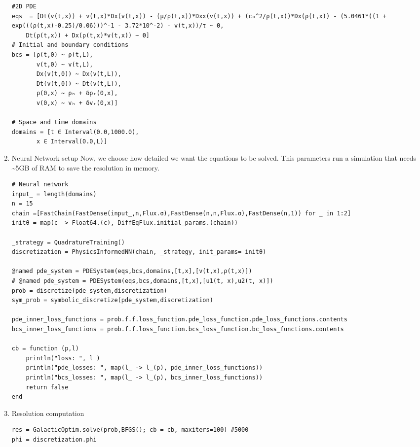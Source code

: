 \documentclass[11pt]{article}
\begin{document}
\begin{enumerate}
\begin{verbatim}
#2D PDE
eqs  = [Dt(v(t,x)) + v(t,x)*Dx(v(t,x)) - (μ/ρ(t,x))*Dxx(v(t,x)) + (c₀^2/ρ(t,x))*Dx(ρ(t,x)) - (5.0461*((1 + exp(((ρ(t,x)-0.25)/0.06)))^-1 - 3.72*10^-2) - v(t,x))/τ ~ 0,
	Dt(ρ(t,x)) + Dx(ρ(t,x)*v(t,x)) ~ 0]
# Initial and boundary conditions
bcs = [ρ(t,0) ~ ρ(t,L),
       v(t,0) ~ v(t,L),
       Dx(v(t,0)) ~ Dx(v(t,L)),
       Dt(v(t,0)) ~ Dt(v(t,L)),
       ρ(0,x) ~ ρₕ + δρᵣ(0,x),
       v(0,x) ~ vₕ + δvᵣ(0,x)]

# Space and time domains
domains = [t ∈ Interval(0.0,1000.0),
	   x ∈ Interval(0.0,L)]
\end{verbatim}

\item Neural Network setup
\label{sec:orgca8cebc}
Now, we choose how detailed we want the equations to be solved. This parameters
run a simulation that needs \textasciitilde{}5GB of RAM to save the resolution in memory.

\begin{verbatim}
# Neural network
input_ = length(domains)
n = 15
chain =[FastChain(FastDense(input_,n,Flux.σ),FastDense(n,n,Flux.σ),FastDense(n,1)) for _ in 1:2]
initθ = map(c -> Float64.(c), DiffEqFlux.initial_params.(chain))

_strategy = QuadratureTraining()
discretization = PhysicsInformedNN(chain, _strategy, init_params= initθ)

@named pde_system = PDESystem(eqs,bcs,domains,[t,x],[v(t,x),ρ(t,x)])
# @named pde_system = PDESystem(eqs,bcs,domains,[t,x],[u1(t, x),u2(t, x)])
prob = discretize(pde_system,discretization)
sym_prob = symbolic_discretize(pde_system,discretization)

pde_inner_loss_functions = prob.f.f.loss_function.pde_loss_function.pde_loss_functions.contents
bcs_inner_loss_functions = prob.f.f.loss_function.bcs_loss_function.bc_loss_functions.contents

cb = function (p,l)
    println("loss: ", l )
    println("pde_losses: ", map(l_ -> l_(p), pde_inner_loss_functions))
    println("bcs_losses: ", map(l_ -> l_(p), bcs_inner_loss_functions))
    return false
end
\end{verbatim}

\item Resolution computation
\label{sec:orgc0c904f}
\begin{verbatim}
res = GalacticOptim.solve(prob,BFGS(); cb = cb, maxiters=100) #5000
phi = discretization.phi


\end{verbatim}
\end{enumerate}
\end{document}
